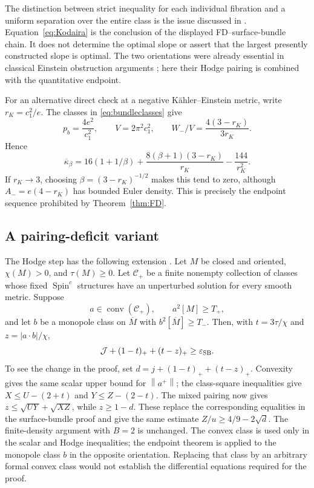 \documentclass[11pt,a4paper]{article}
\theoremstyle{definition}
\theoremstyle{remark}
\newcommand{\Sc}{\operatorname{Spin}^{c}}
\newcommand{\J}{\mathcal J}
\newcommand{\norm}[1]{\left\lVert#1\right\rVert}
\begin{document}
The distinction between strict inequality for each individual fibration and a uniform separation over the entire class is the issue discussed in \cite{CataneseRollenske,Catanese}. Equation~\eqref{eq:Kodaira} is the conclusion of the displayed FD--surface-bundle chain. It does not determine the optimal slope or assert that the largest presently constructed slope is optimal. The two orientations were already essential in classical Einstein obstruction arguments \cite{Kotschick1999}; here their Hodge pairing is combined with the quantitative endpoint.

For an alternative direct check at a negative K\"ahler--Einstein metric, write $r_K=c_1^2/e$. The classes in \eqref{eq:bundleclasses} give
\[
 p_b=\frac{4e^2}{c_1^2},\qquad V=2\pi^2c_1^2,\qquad
 W_-/V=\frac{4(3-r_K)}{3r_K}.
\]
Hence
\[
 \overline\kappa_\beta
 =16(1+1/\beta)+\frac{8(\beta+1)(3-r_K)}{r_K}-\frac{144}{r_K^2}.
\]
If $r_K\to3$, choosing $\beta=(3-r_K)^{-1/2}$ makes this tend to zero, although $A_-=e(4-r_K)$ has bounded Euler density. This is precisely the endpoint sequence prohibited by Theorem~\ref{thm:FD}.

\subsection{A pairing-deficit variant}
The Hodge step has the following extension \cite{PairGap}. Let $M$ be closed and oriented, $\chi(M)>0$, and $\tau(M)\ge0$. Let $\mathcal C_+$ be a finite nonempty collection of classes whose fixed $\Sc$ structures have an unperturbed solution for every smooth metric. Suppose
\[
 a\in\operatorname{conv}(\mathcal C_+),\qquad a^2[M]\ge T_+,
\]
and let $b$ be a monopole class on $\overline M$ with $b^2[\overline M]\ge T_-$. Then, with $t=3\tau/\chi$ and $z=|a\cdot b|/\chi$,
\begin{equation}
 \J+(1-t)_++(t-z)_+\ge\varepsilon_{\rm SB}.
 \label{eq:pairgap}
\end{equation}
To see the change in the proof, set $d=j+(1-t)_++(t-z)_+$. Convexity gives the same scalar upper bound for $\norm{a^+}$; the class-square inequalities give $X\le U-(2+t)$ and $Y\le Z-(2-t)$. The mixed pairing now gives $z\le\sqrt{UY}+\sqrt{XZ}$, while $z\ge1-d$. These replace the corresponding equalities in the surface-bundle proof and give the same estimate $Z/u\ge4/9-2\sqrt d$. The finite-density argument with $B=2$ is unchanged. The convex class is used only in the scalar and Hodge inequalities; the endpoint theorem is applied to the monopole class $b$ in the opposite orientation. Replacing that class by an arbitrary formal convex class would not establish the differential equations required for the proof.
\end{document}
